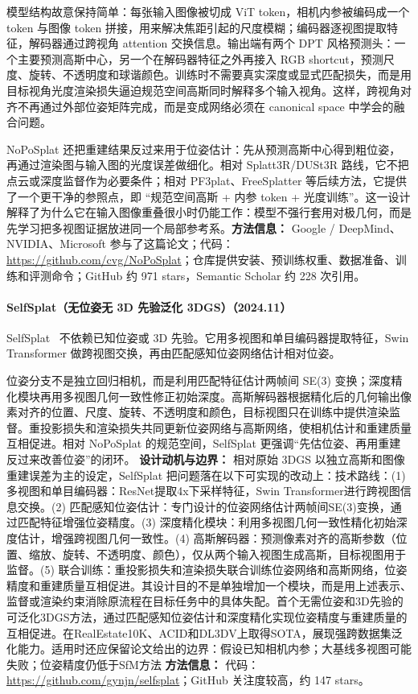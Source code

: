模型结构故意保持简单：每张输入图像被切成 ViT token，相机内参被编码成一个 token 与图像 token 拼接，用来解决焦距引起的尺度模糊；编码器逐视图提取特征，解码器通过跨视角 attention 交换信息。输出端有两个 DPT 风格预测头：一个主要预测高斯中心，另一个在解码器特征之外再接入 RGB shortcut，预测尺度、旋转、不透明度和球谐颜色。训练时不需要真实深度或显式匹配损失，而是用目标视角光度渲染损失逼迫规范空间高斯同时解释多个输入视角。这样，跨视角对齐不再通过外部位姿矩阵完成，而是变成网络必须在 canonical space 中学会的融合问题。

NoPoSplat 还把重建结果反过来用于位姿估计：先从预测高斯中心得到粗位姿，再通过渲染图与输入图的光度误差做细化。相对 Splatt3R/DUSt3R 路线，它不把点云或深度监督作为必要条件；相对 PF3plat、FreeSplatter 等后续方法，它提供了一个更干净的参照点，即 ``规范空间高斯 + 内参 token + 光度训练''。这一设计解释了为什么它在输入图像重叠很小时仍能工作：模型不强行套用对极几何，而是先学习把多视图证据放进同一个局部参考系。\textbf{方法信息：} Google / DeepMind、NVIDIA、Microsoft 参与了这篇论文；代码：\url{https://github.com/cvg/NoPoSplat}；仓库提供安装、预训练权重、数据准备、训练和评测命令；GitHub 约 971 stars，Semantic Scholar 约 228 次引用。



\paragraph{SelfSplat（无位姿无 3D 先验泛化 3DGS）（2024.11）}
SelfSplat~\cite{2411_17190} 不依赖已知位姿或 3D 先验。它用多视图和单目编码器提取特征，Swin Transformer 做跨视图交换，再由匹配感知位姿网络估计相对位姿。

位姿分支不是独立回归相机，而是利用匹配特征估计两帧间 SE(3) 变换；深度精化模块再用多视图几何一致性修正初始深度。高斯解码器根据精化后的几何输出像素对齐的位置、尺度、旋转、不透明度和颜色，目标视图只在训练中提供渲染监督。重投影损失和渲染损失共同更新位姿网络与高斯网络，使相机估计和重建质量互相促进。相对 NoPoSplat 的规范空间，SelfSplat 更强调“先估位姿、再用重建反过来改善位姿”的闭环。
\textbf{设计动机与边界：} 相对原始 3DGS 以独立高斯和图像重建误差为主的设定，SelfSplat 把问题落在以下可实现的改动上：技术路线：(1) 多视图和单目编码器：ResNet提取4x下采样特征，Swin Transformer进行跨视图信息交换。(2) 匹配感知位姿估计：专门设计的位姿网络估计两帧间SE(3)变换，通过匹配特征增强位姿精度。(3) 深度精化模块：利用多视图几何一致性精化初始深度估计，增强跨视图几何一致性。(4) 高斯解码器：预测像素对齐的高斯参数（位置、缩放、旋转、不透明度、颜色），仅从两个输入视图生成高斯，目标视图用于监督。(5) 联合训练：重投影损失和渲染损失联合训练位姿网络和高斯网络，位姿精度和重建质量互相促进。其设计目的不是单独增加一个模块，而是用上述表示、监督或渲染约束消除原流程在目标任务中的具体失配。首个无需位姿和3D先验的可泛化3DGS方法，通过匹配感知位姿估计和深度精化实现位姿精度与重建质量的互相促进。在RealEstate10K、ACID和DL3DV上取得SOTA，展现强跨数据集泛化能力。适用时还应保留论文给出的边界：假设已知相机内参；大基线多视图可能失败；位姿精度仍低于SfM方法
\textbf{方法信息：} 代码：\url{https://github.com/gynjn/selfsplat}；GitHub 关注度较高，约 147 stars。



